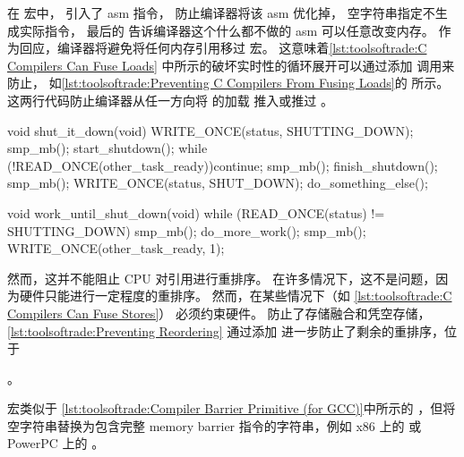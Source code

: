 在  宏中， 引入了 asm 指令，
 防止编译器将该 asm 优化掉，
空字符串指定不生成实际指令，
最后的  告诉编译器这个什么都不做的 asm
可以任意改变内存。
作为回应，编译器将避免将任何内存引用移过  宏。
这意味着\cref{lst:toolsoftrade:C Compilers Can Fuse Loads}
中所示的破坏实时性的循环展开可以通过添加  调用来防止，
如\cref{lst:toolsoftrade:Preventing C Compilers From Fusing Loads}的
所示。
这两行代码防止编译器从任一方向将  的加载
推入或推过 。

\begin{listing}
\begin{fcvlabel}
\begin{VerbatimL}[commandchars=\\\[\]]
void shut_it_down(void)
{
	WRITE_ONCE(status, SHUTTING_DOWN);
	smp_mb(); \lnlbl[mb1]
	start_shutdown();
	while (!READ_ONCE(other_task_ready))\lnlbl[loop:b]
		continue;
	smp_mb(); \lnlbl[mb2]
	finish_shutdown();
	smp_mb(); \lnlbl[mb3]
	WRITE_ONCE(status, SHUT_DOWN);
	do_something_else();
}

void work_until_shut_down(void)
{
	while (READ_ONCE(status) != SHUTTING_DOWN) {
		smp_mb(); \lnlbl[mb4]
		do_more_work();
	}
	smp_mb(); \lnlbl[mb5]
	WRITE_ONCE(other_task_ready, 1);
}
\end{VerbatimL}
\end{fcvlabel}
\caption{防止重排序}
\label{lst:toolsoftrade:Preventing Reordering}
\end{listing}

然而，这并不能阻止 CPU 对引用进行重排序。
在许多情况下，这不是问题，因为硬件只能进行一定程度的重排序。
然而，在某些情况下（如
\cref{lst:toolsoftrade:C Compilers Can Fuse Stores}）
必须约束硬件。
防止了存储融合和凭空存储，
\cref{lst:toolsoftrade:Preventing Reordering}
通过添加  进一步防止了剩余的重排序，位于
\begin{fcvref}
。
\end{fcvref}
 宏类似于
\cref{lst:toolsoftrade:Compiler Barrier Primitive (for GCC)}中所示的
，但将空字符串替换为包含完整 memory barrier
指令的字符串，例如 x86 上的  或 PowerPC 上的 。

